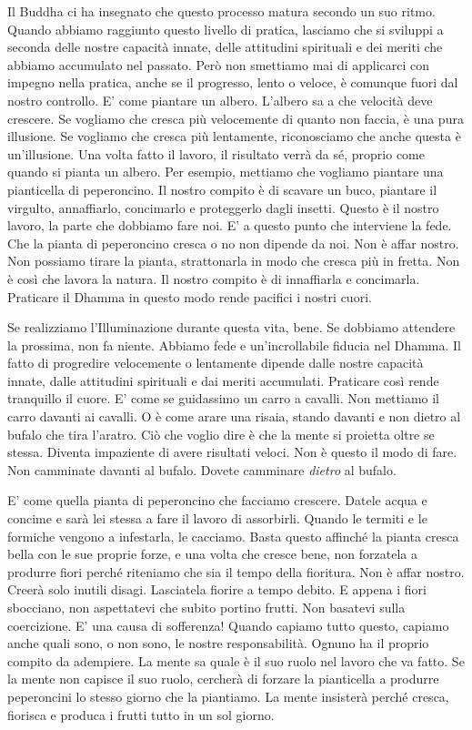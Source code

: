 Il Buddha ci ha insegnato che questo processo matura secondo un suo
ritmo. Quando abbiamo raggiunto questo livello di pratica, lasciamo che
si sviluppi a seconda delle nostre capacità innate, delle attitudini
spirituali e dei meriti che abbiamo accumulato nel passato. Però non
smettiamo mai di applicarci con impegno nella pratica, anche se il
progresso, lento o veloce, è comunque fuori dal nostro controllo. E'
come piantare un albero. L'albero sa a che velocità deve crescere. Se
vogliamo che cresca più velocemente di quanto non faccia, è una pura
illusione. Se vogliamo che cresca più lentamente, riconosciamo che anche
questa è un'illusione. Una volta fatto il lavoro, il risultato verrà da
sé, proprio come quando si pianta un albero. Per esempio, mettiamo che
vogliamo piantare una pianticella di peperoncino. Il nostro compito è di
scavare un buco, piantare il virgulto, annaffiarlo, concimarlo e
proteggerlo dagli insetti. Questo è il nostro lavoro, la parte che
dobbiamo fare noi. E' a questo punto che interviene la fede. Che la
pianta di peperoncino cresca o no non dipende da noi. Non è affar
nostro. Non possiamo tirare la pianta, strattonarla in modo che cresca
più in fretta. Non è così che lavora la natura. Il nostro compito è di
innaffiarla e concimarla. Praticare il Dhamma in questo modo rende
pacifici i nostri cuori.

Se realizziamo l'Illuminazione durante questa vita, bene. Se dobbiamo
attendere la prossima, non fa niente. Abbiamo fede e un'incrollabile
fiducia nel Dhamma. Il fatto di progredire velocemente o lentamente
dipende dalle nostre capacità innate, dalle attitudini spirituali e dai
meriti accumulati. Praticare così rende tranquillo il cuore. E' come se
guidassimo un carro a cavalli. Non mettiamo il carro davanti ai cavalli.
O è come arare una risaia, stando davanti e non dietro al bufalo che
tira l'aratro. Ciò che voglio dire è che la mente si proietta oltre se
stessa. Diventa impaziente di avere risultati veloci. Non è questo il
modo di fare. Non camminate davanti al bufalo. Dovete
camminare \emph{dietro} al bufalo.

E' come quella pianta di peperoncino che facciamo crescere. Datele acqua
e concime e sarà lei stessa a fare il lavoro di assorbirli. Quando le
termiti e le formiche vengono a infestarla, le cacciamo. Basta questo
affinché la pianta cresca bella con le sue proprie forze, e una volta
che cresce bene, non forzatela a produrre fiori perché riteniamo che sia
il tempo della fioritura. Non è affar nostro. Creerà solo inutili
disagi. Lasciatela fiorire a tempo debito. E appena i fiori sbocciano,
non aspettatevi che subito portino frutti. Non basatevi sulla
coercizione. E' una causa di sofferenza! Quando capiamo tutto questo,
capiamo anche quali sono, o non sono, le nostre responsabilità. Ognuno
ha il proprio compito da adempiere. La mente sa quale è il suo ruolo nel
lavoro che va fatto. Se la mente non capisce il suo ruolo, cercherà di
forzare la pianticella a produrre peperoncini lo stesso giorno che la
piantiamo. La mente insisterà perché cresca, fiorisca e produca i frutti
tutto in un sol giorno.

